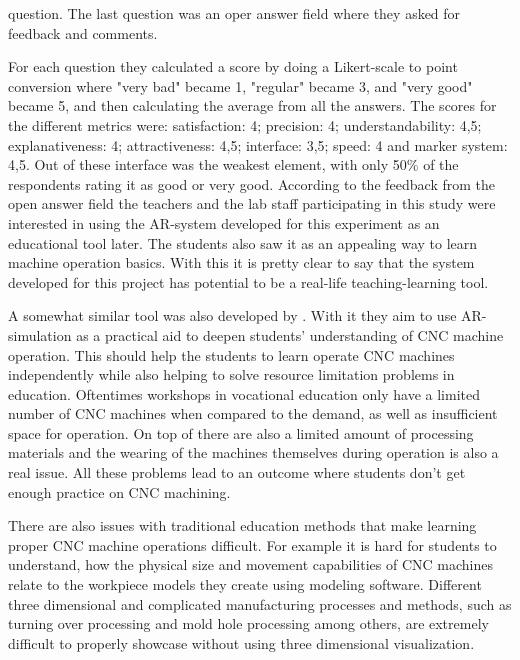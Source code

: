 question. The last question was an oper answer field where they asked for 
feedback and comments.\cite{reyesEtAl2016}\par
	For each question they calculated a score by doing a Likert-scale to 
point conversion where "very bad" became 1, "regular" became 3, and "very 
good" became 5, and then calculating the average from all the answers. The 
scores for the different metrics were: satisfaction: 4; precision: 4; 
understandability: 4,5; explanativeness: 4; attractiveness: 4,5; interface: 
3,5; speed: 4 and marker system: 4,5. Out of these interface was the weakest 
element, with only 50\% of the respondents rating it as good or very 
good.\cite{reyesEtAl2016} According to the feedback from the open answer 
field the teachers and the lab staff participating in this study were 
interested in using the AR-system developed for this experiment as an 
educational tool later. The students also saw it as an appealing way to learn 
machine operation basics.\cite{reyesEtAl2016} With this it is pretty clear to 
say that the system developed for this project has potential to be a 
real-life teaching-learning tool.\par
	A somewhat similar tool was also developed by 
\textcite{LinAndLee2020}. With it they aim to use AR-simulation as a 
practical aid to deepen students' understanding of CNC machine operation. 
This should help the students to learn operate CNC machines independently 
while also helping to solve resource limitation problems in education. 
Oftentimes workshops in vocational education only have a limited number of 
CNC machines when compared to the demand, as well as insufficient space for 
operation. On top of there are also a limited amount of processing materials 
and the wearing of the machines themselves during operation is also a real 
issue.\cite{LinAndLee2020} All these problems lead to an outcome where 
students don't get enough practice on CNC machining.\cite{LinAndLee2020}\par
	There are also issues with traditional education methods that make 
learning proper CNC machine operations difficult. For example it is hard for 
students to understand, how the physical size and movement capabilities of 
CNC machines relate to the workpiece models they create using modeling 
software.\cite{LinAndLee2020} Different three dimensional and complicated 
manufacturing processes and methods, such as turning over processing and mold 
hole processing among others, are extremely difficult to properly showcase 
without using three dimensional visualization.\cite{LinAndLee2020} 
